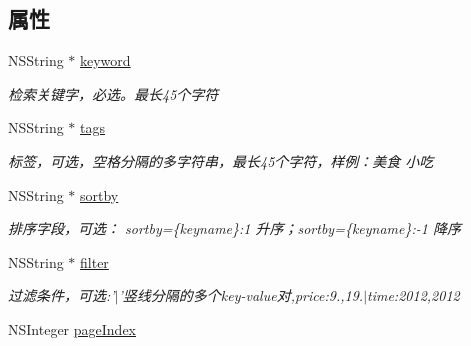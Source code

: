 \subsection*{属性}
\begin{DoxyCompactItemize}
\item 
\hypertarget{interface_b_m_k_cloud_search_info_a90f2d3ef36a31112ca8fdb6d70fabea6}{N\+S\+String $\ast$ \hyperlink{interface_b_m_k_cloud_search_info_a90f2d3ef36a31112ca8fdb6d70fabea6}{keyword}}\label{interface_b_m_k_cloud_search_info_a90f2d3ef36a31112ca8fdb6d70fabea6}

\begin{DoxyCompactList}\small\item\em 检索关键字，必选。最长45个字符 \end{DoxyCompactList}\item 
\hypertarget{interface_b_m_k_cloud_search_info_ae2c16f1281195d1fbf738ac23552d8f7}{N\+S\+String $\ast$ \hyperlink{interface_b_m_k_cloud_search_info_ae2c16f1281195d1fbf738ac23552d8f7}{tags}}\label{interface_b_m_k_cloud_search_info_ae2c16f1281195d1fbf738ac23552d8f7}

\begin{DoxyCompactList}\small\item\em 标签，可选，空格分隔的多字符串，最长45个字符，样例：美食 小吃 \end{DoxyCompactList}\item 
N\+S\+String $\ast$ \hyperlink{interface_b_m_k_cloud_search_info_ab0d42d1b9e841c5e538e457e819a07f7}{sortby}
\begin{DoxyCompactList}\small\item\em 排序字段，可选： sortby=\{keyname\}\+:1 升序；sortby=\{keyname\}\+:-\/1 降序 \end{DoxyCompactList}\item 
N\+S\+String $\ast$ \hyperlink{interface_b_m_k_cloud_search_info_a65d91501d19f2a6aa027de6f9e5bc837}{filter}
\begin{DoxyCompactList}\small\item\em 过滤条件，可选\+:'$\vert$'竖线分隔的多个key-\/value对,price\+:9.,19.$\vert$time\+:2012,2012 \end{DoxyCompactList}\item 
\hypertarget{interface_b_m_k_cloud_search_info_aeea99c3907cafe38def8105839ad4c8a}{N\+S\+Integer \hyperlink{interface_b_m_k_cloud_search_info_aeea99c3907cafe38def8105839ad4c8a}{page\+Index}}\label{interface_b_m_k_cloud_search_info_aeea99c3907cafe38def8105839ad4c8a}


\end{DoxyCompactItemize}
